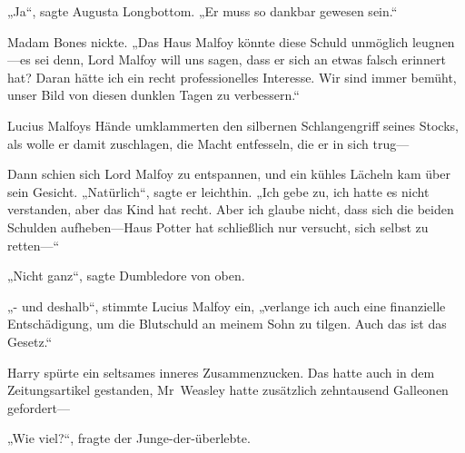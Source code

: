 „Ja“, sagte Augusta Longbottom. „Er muss so dankbar gewesen sein.“

Madam Bones nickte. „Das Haus Malfoy könnte diese Schuld unmöglich leugnen—es sei denn, Lord Malfoy will uns sagen, dass er sich an etwas falsch erinnert hat? Daran hätte ich ein recht professionelles Interesse. Wir sind immer bemüht, unser Bild von diesen dunklen Tagen zu verbessern.“

Lucius Malfoys Hände umklammerten den silbernen Schlangengriff seines Stocks, als wolle er damit zuschlagen, die Macht entfesseln, die er in sich trug—

Dann schien sich Lord Malfoy zu entspannen, und ein kühles Lächeln kam über sein Gesicht. „Natürlich“, sagte er leichthin. „Ich gebe zu, ich hatte es nicht verstanden, aber das Kind hat recht. Aber ich glaube nicht, dass sich die beiden Schulden aufheben—Haus Potter hat schließlich nur versucht, sich selbst zu retten—“

„Nicht ganz“, sagte Dumbledore von oben.

„- und deshalb“, stimmte Lucius Malfoy ein, „verlange ich auch eine finanzielle Entschädigung, um die Blutschuld an meinem Sohn zu tilgen. Auch das ist das Gesetz.“

Harry spürte ein seltsames inneres Zusammenzucken. Das hatte auch in dem Zeitungsartikel gestanden, Mr~Weasley hatte zusätzlich zehntausend Galleonen gefordert—

„Wie viel?“, fragte der Junge-der-überlebte.

